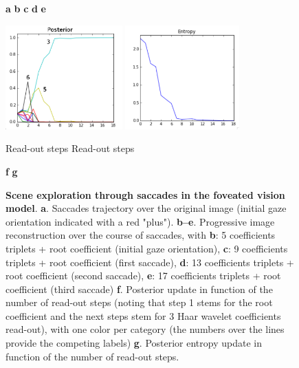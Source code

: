 \documentclass{article}
\begin{document}
\begin{figure}[b!]
	\centerline{\textbf{a} \hspace{2.6cm} \textbf{b} \hspace{2.4cm} \textbf{c} \hspace{2.4cm} \textbf{d} \hspace{2.6cm} \textbf{e}}
	\centerline{\includegraphics[width = .4\linewidth,height=4cm]{img/saccade-3-post.png} 
		\includegraphics[width = .4\linewidth,height=4cm]{img/saccade-3-entropy.png} }
	\vspace{-.2cm}
	\centerline{Read-out steps \hspace{3.6cm} Read-out steps}
	\centerline{\textbf{f} \hspace{5.5cm} \textbf{g}}
	\caption{\textbf{Scene exploration through saccades in the foveated vision model}. \textbf{a}. Saccades trajectory over the original image (initial gaze orientation indicated with a red "plus"). \textbf{b--e}. Progressive image reconstruction over the course of saccades, with \textbf{b}: 5 coefficients triplets + root coefficient (initial gaze orientation), \textbf{c}: 9 coefficients triplets + root coefficient (first saccade), \textbf{d}: 13 coefficients triplets + root coefficient (second saccade), \textbf{e}: 17 coefficients triplets + root coefficient (third saccade) \textbf{f}. Posterior update in function of the number of read-out steps (noting that step 1 stems for the root coefficient and the next steps stem for 3 Haar wavelet coefficients read-out), with one color per category (the numbers over the lines provide the competing labels) \textbf{g}. Posterior entropy update in function of the number of read-out steps.}\label{fig:foveated-saccades}
\end{figure}
\end{document}
